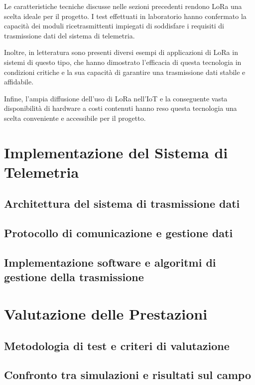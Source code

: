 \documentclass[12pt,a4paper,twoside]{book}
\begin{document}
Le caratteristiche tecniche discusse nelle sezioni precedenti rendono \ac{LoRa} 
una scelta ideale per il progetto.
I test effettuati in laboratorio hanno confermato la capacità dei moduli 
ricetrasmittenti impiegati di soddisfare i requisiti di trasmissione dati del 
sistema di telemetria.

Inoltre, in letteratura sono presenti diversi esempi di applicazioni di \ac{LoRa} in
sistemi di questo tipo\cite{Misbahuddin2022}\cite{Ma2024}, che hanno dimostrato
l'efficacia di questa tecnologia in condizioni critiche e la sua capacità di 
garantire una trasmissione dati stabile e affidabile.

Infine, l'ampia diffusione dell'uso di \ac{LoRa} nell'\ac{IoT} e la conseguente
vasta disponibilità di hardware a costi contenuti hanno reso questa tecnologia
una scelta conveniente e accessibile per il progetto.

\chapter{Implementazione del Sistema di Telemetria} \label{chap:telemetry}

\section{Architettura del sistema di trasmissione dati}
\section{Protocollo di comunicazione e gestione dati}
\section{Implementazione software e algoritmi di gestione della trasmissione}

\chapter{Valutazione delle Prestazioni} \label{chap:performance}

\section{Metodologia di test e criteri di valutazione}
\section{Confronto tra simulazioni e risultati sul campo}
\end{document}
